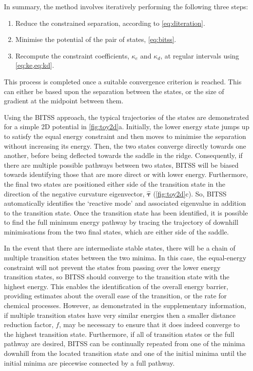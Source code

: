 \documentclass[twocolumn,10pt]{revtex4}
\newcommand{\bm}[1]{\boldsymbol{\mathbf{#1}}}
\begin{document}
In summary, the method involves iteratively performing the following three steps:
\begin{enumerate}
  \item Reduce the constrained separation, according to \cref{eq:diteration}.
  \item Minimise the potential of the pair of states, \cref{eq:bitss}.
  \item Recompute the constraint coefficients, $\kappa_e$ and $\kappa_d$, at regular intervals using \cref{eq:ke,eq:kd}.
\end{enumerate}
This process is completed once a suitable convergence criterion is reached.
This can either be based upon the separation between the states, or the size of gradient at the midpoint between them.

Using the BITSS approach, the typical trajectories of the states are demonstrated for a simple 2D potential in \cref{fig:toy2d}a.
Initially, the lower energy state jumps up to satisfy the equal energy constraint and then moves to minimise the separation without increasing its energy.
Then, the two states converge directly towards one another, before being deflected towards the saddle in the ridge.
Consequently, if there are multiple possible pathways between two states, BITSS will be biased towards identifying those that are more direct or with lower energy.
Furthermore, the final two states are positioned either side of the transition state in the direction of the negative curvature eigenvector, $\bm{\hat{\tau}}$ (\cref{fig:toy2d}c).
So, BITSS automatically identifies the `reactive mode' and associated eigenvalue in addition to the transition state.
Once the transition state has been identified, it is possible to find the full minimum energy pathway by tracing the trajectory of downhill minimisations from the two final states, which are either side of the saddle.

In the event that there are intermediate stable states, there will be a chain of multiple transition states between the two minima.
In this case, the equal-energy constraint will not prevent the states from passing over the lower energy transition states, so BITSS should converge to the transition state with the highest energy.
This enables the identification of the overall energy barrier, providing estimates about the overall ease of the transition, or the rate for chemical processes.
However, as demonstrated in the supplementary information, if multiple transition states have very similar energies then a smaller distance reduction factor, $f$, may be necessary to ensure that it does indeed converge to the highest transition state.
Furthermore, if all of transition states or the full pathway are desired, BITSS can be continually repeated from one of the minima downhill from the located transition state and one of the initial minima until the initial minima are piecewise connected by a full pathway.
\end{document}
